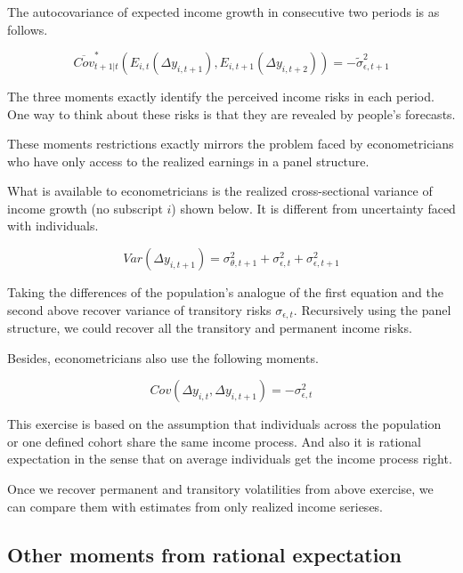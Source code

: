\documentclass[12pt,notitlepage,onecolumn,aps,pra]{revtex4-1}
\begin{document}
The autocovariance of expected income growth in consecutive two periods
is as follows.

\begin{equation}
\overline {Cov}^*_{t+1|t}(E_{i,t}(\Delta y_{i,t+1}),E_{i,t+1}(\Delta y_{i,t+2}) ) = - \tilde \sigma^2_{\epsilon,t+1}
\end{equation}

The three moments exactly identify the perceived income risks in each
period. One way to think about these risks is that they are revealed by
people's forecasts.

These moments restrictions exactly mirrors the problem faced by
econometricians who have only access to the realized earnings in a panel
structure.

What is available to econometricians is the realized cross-sectional
variance of income growth (no subscript \(i\)) shown below. It is
different from uncertainty faced with individuals.

\begin{equation}
Var (\Delta y_{i,t+1}) =  \sigma^2_{\theta,t+1} +\sigma^2_{\epsilon,t}+ \sigma^2_{\epsilon,t+1}
\end{equation}

Taking the differences of the population's analogue of the first
equation and the second above recover variance of transitory risks
\(\sigma_{\epsilon,t}\). Recursively using the panel structure, we could
recover all the transitory and permanent income risks.

Besides, econometricians also use the following moments.

\begin{equation}
Cov (\Delta y_{i,t}, \Delta y_{i,t+1}) =  -\sigma^2_{\epsilon,t}
\end{equation}

This exercise is based on the assumption that individuals across the
population or one defined cohort share the same income process. And also
it is rational expectation in the sense that on average individuals get
the income process right.

Once we recover permanent and transitory volatilities from above
exercise, we can compare them with estimates from only realized income
serieses.

\hypertarget{other-moments-from-rational-expectation}{%
\subsection{Other moments from rational
expectation}\label{other-moments-from-rational-expectation}}
\end{document}
